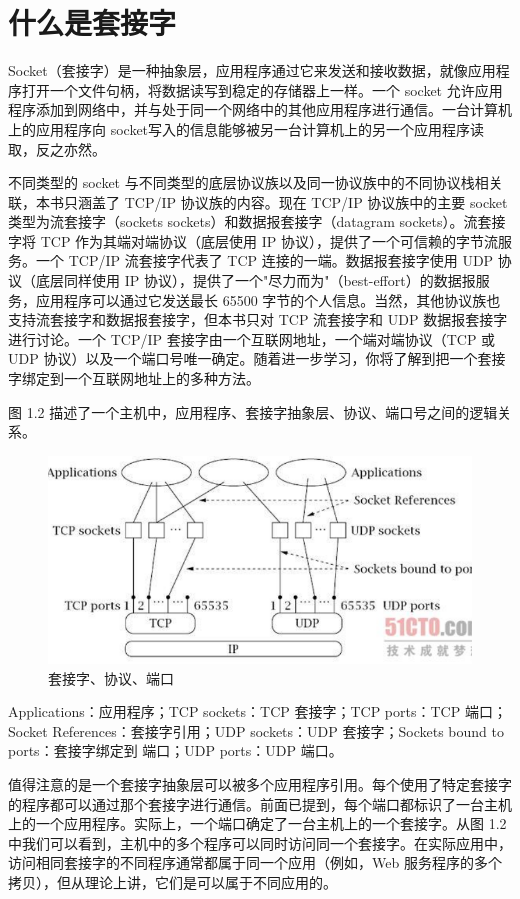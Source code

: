 	\section{什么是套接字}

		Socket（套接字）是一种抽象层，应用程序通过它来发送和接收数据，就像应用程序打开一个文件句柄，将数据读写到稳定的存储器上一样。一个 socket 允许应用程序添加到网络中，并与处于同一个网络中的其他应用程序进行通信。一台计算机上的应用程序向 socket写入的信息能够被另一台计算机上的另一个应用程序读取，反之亦然。

		不同类型的 socket 与不同类型的底层协议族以及同一协议族中的不同协议栈相关联，本书只涵盖了 TCP/IP 协议族的内容。现在 TCP/IP 协议族中的主要 socket 类型为流套接字（sockets sockets）和数据报套接字（datagram sockets）。流套接字将 TCP 作为其端对端协议（底层使用 IP 协议），提供了一个可信赖的字节流服务。一个 TCP/IP 流套接字代表了 TCP 连接的一端。数据报套接字使用 UDP 协议（底层同样使用 IP 协议），提供了一个"尽力而为"（best-effort）的数据报服务，应用程序可以通过它发送最长 65500 字节的个人信息。当然，其他协议族也支持流套接字和数据报套接字，但本书只对 TCP 流套接字和 UDP 数据报套接字进行讨论。一个 TCP/IP 套接字由一个互联网地址，一个端对端协议（TCP 或 UDP 协议）以及一个端口号唯一确定。随着进一步学习，你将了解到把一个套接字绑定到一个互联网地址上的多种方法。

		图 1.2 描述了一个主机中，应用程序、套接字抽象层、协议、端口号之间的逻辑关系。
		\begin{figure}[htbp]%
			\centering
			\includegraphics[scale=.6]{img/01.02.png}
			\caption{套接字、协议、端口}
			\label{fig:socket.trans}
		\end{figure}

		Applications：应用程序；TCP sockets：TCP 套接字；TCP ports：TCP 端口；Socket References：套接字引用；UDP sockets：UDP 套接字；Sockets bound to ports：套接字绑定到 端口；UDP ports：UDP 端口。

		值得注意的是一个套接字抽象层可以被多个应用程序引用。每个使用了特定套接字的程序都可以通过那个套接字进行通信。前面已提到，每个端口都标识了一台主机上的一个应用程序。实际上，一个端口确定了一台主机上的一个套接字。从图 1.2 中我们可以看到，主机中的多个程序可以同时访问同一个套接字。在实际应用中，访问相同套接字的不同程序通常都属于同一个应用（例如，Web 服务程序的多个拷贝），但从理论上讲，它们是可以属于不同应用的。


